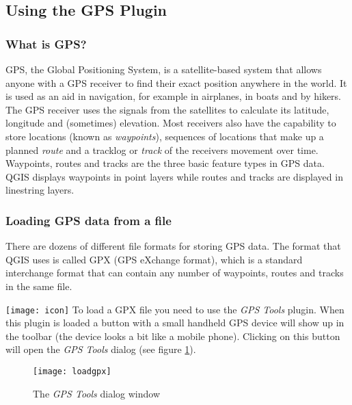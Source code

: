 \subsection{Using the GPS Plugin}\label{label_plugingps}

\subsubsection{What is GPS?}\label{whatsgps}

GPS, the Global Positioning System, is a satellite-based system that
allows anyone with a GPS receiver to find their exact position anywhere
in the world. It is used as an aid in navigation, for example in airplanes,
in boats and by hikers. The GPS receiver uses the signals from the
satellites to calculate its latitude, longitude and (sometimes) elevation.
Most receivers also have the capability to store locations (known
as \emph{waypoints}), sequences of locations that make up a planned
\emph{route} and a tracklog or \emph{track} of the receivers movement
over time. Waypoints, routes and tracks are the three basic feature
types in GPS data. QGIS displays waypoints in point layers while routes
and tracks are displayed in linestring layers.

\subsubsection{Loading GPS data from a file}\label{label_loadgps}

There are dozens of different file formats for storing GPS data. The
format that QGIS uses is called GPX (GPS eXchange format), which is
a standard interchange format that can contain any number of waypoints,
routes and tracks in the same file.

\texttt{[image: icon]} To load a GPX file you need to use the
\emph{GPS
Tools} plugin. When this plugin is loaded a button with a small handheld GPS
device will show up in the toolbar (the device looks a bit like a mobile
phone). Clicking on this button will open the \emph{GPS Tools} dialog (see
figure \ref{figure GPX loader}).

\begin{figure}[ht]
   \begin{center}
\caption{\label{figure GPX loader}The \emph{GPS Tools} dialog window}
\texttt{[image: loadgpx]}
\end{center}
\end{figure}

